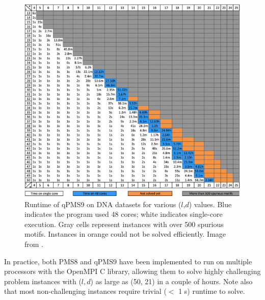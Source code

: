\documentclass[oneside,12pt]{DISCSthesis}
\begin{document}
			\begin{figure}[ht] \label{fig:qpms9}
				\centering
				\includegraphics[width=5.3in]{img/qpms9}
				\caption{Runtime of qPMS9 on DNA datasets for various ($l$,$d$) values. Blue indicates the program used 48 cores; white indicates single-core execution. Gray cells represent instances with over 500 spurious motifs. Instances in orange could not be solved efficiently. Image from \cite{pms2015}.}
				\end{figure}\vspace*{2mm}

		\noindent In practice, both PMS8 and qPMS9 have been implemented to run on multiple processors with the OpenMPI C library, allowing them to solve highly challenging problem instances with ($l, d$) as large as (50, 21) in a couple of hours. Note also that most non-challenging instances require trivial ($<$ 1 s) runtime to solve.
		\newpage
\end{document}
